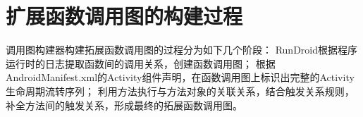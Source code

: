 \begin{table}[!ht]
{\begin{threeparttable}[b]
\begin{tabular}{|l|c|}
				
				
				
			\end{tabular}
			
			
		\end{threeparttable}
	}
\end{table}

\section{扩展函数调用图的构建过程}

调用图构建器构建拓展函数调用图的过程分为如下几个阶段：
 RunDroid根据程序运行时的日志提取函数间的调用关系，创建函数调用图；
根据AndroidManifest.xml的Activity组件声明，在函数调用图上标识出完整的Activity 生命周期流转序列；
利用方法执行与方法对象的关联关系，结合触发关系规则，补全方法间的触发关系，形成最终的拓展函数调用图。




